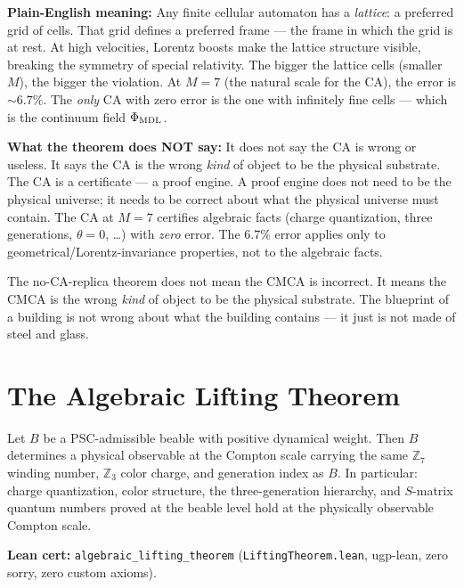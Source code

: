 \documentclass[11pt,a4paper]{article}
\newcommand{\lean}[1]{\texttt{#1}}
\newcommand{\PhiMDL}{\Phi_{\rm MDL}}
\newcommand{\ZS}{\mathbb{Z}_7}
\newcommand{\CatAL}{\textsc{CatAL}}
\begin{document}
\medskip\noindent
\textbf{Plain-English meaning:}
Any finite cellular automaton has a \emph{lattice}: a preferred grid of
cells.
That grid defines a preferred frame --- the frame in which the grid is at
rest.
At high velocities, Lorentz boosts make the lattice structure visible,
breaking the symmetry of special relativity.
The bigger the lattice cells (smaller $M$), the bigger the violation.
At $M = 7$ (the natural scale for the CA), the error is $\sim 6.7\%$.
The \emph{only} CA with zero error is the one with infinitely fine cells ---
which is the continuum field $\PhiMDL$.

\medskip
\textbf{What the theorem does NOT say:}
It does not say the CA is wrong or useless.
It says the CA is the wrong \emph{kind} of object to be the physical
substrate.
The CA is a certificate --- a proof engine.
A proof engine does not need to be the physical universe; it needs to be
correct about what the physical universe must contain.
The CA at $M = 7$ certifies algebraic facts (charge quantization,
three generations, $\theta = 0$, \ldots) with \emph{zero} error.
The $6.7\%$ error applies only to geometrical/Lorentz-invariance properties,
not to the algebraic facts.

\begin{tcolorbox}[colback=boxblue,colframe=blue!40!black,
  title=The blueprint is not wrong; it is not a building]
The no-CA-replica theorem does not mean the CMCA is incorrect.
It means the CMCA is the wrong \emph{kind} of object to be the physical
substrate.
The blueprint of a building is not wrong about what the building contains
--- it just is not made of steel and glass.
\end{tcolorbox}

\section{The Algebraic Lifting Theorem}
\label{sec:lifting}

\begin{tcolorbox}[colback=boxgreen,colframe=green!50!black,
  title={Theorem: Algebraic Lifting (\CatAL, zero sorry, zero custom axioms)}]
Let $B$ be a PSC-admissible beable with positive dynamical weight.
Then $B$ determines a physical observable at the Compton scale carrying the
same $\ZS$ winding number, $\mathbb{Z}_3$ color charge, and generation index
as $B$.
In particular: charge quantization, color structure, the three-generation
hierarchy, and $S$-matrix quantum numbers proved at the beable level hold
at the physically observable Compton scale.

\smallskip\noindent
\textbf{Lean cert:}
\lean{algebraic\_lifting\_theorem}
(\lean{LiftingTheorem.lean}, ugp-lean, zero sorry, zero custom axioms).
\end{tcolorbox}
\end{document}
